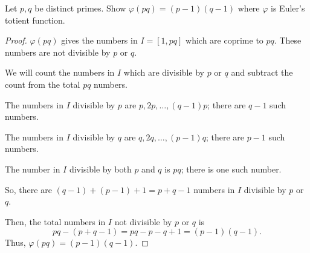 \documentclass[../hw2]{subfiles}
\begin{document}
\begin{problem}[7]
Let $p,q$ be distinct primes.
Show  $\varphi(pq)=(p-1)(q-1)$ where  $\varphi$ is Euler's totient function.
\end{problem}
\begin{proof}
	$\varphi(pq)$ gives the numbers in  $I=[1,pq]$ which are coprime to $pq$.
	These numbers are not divisible by  $p$ or  $q$.

	We will count the numbers in  $I$ which are divisible by  $p$ or  $q$ and subtract the count from the total  $pq$ numbers.

	The numbers in $I$ divisible by $p$ are  $p,2p,\ldots,(q-1)p$; there are $q-1$ such numbers.

	The numbers in $I$ divisible by  $q$ are  $q,2q,\ldots,(p-1)q$; there are $p-1$ such numbers.

	The number in  $I$ divisible by both  $p$ and  $q$  is $pq$; there is one such number.

	So, there are  $(q-1)+(p-1)+1=p+q-1$ numbers in  $I$ divisible by  $p$ or  $q$.

	Then, the total numbers in  $I$ not divisible by  $p$ or  $q$ is  \[
		pq-(p+q-1)=pq-p-q+1=(p-1)(q-1)
		.\]
	Thus, $\varphi(pq) = (p-1)(q-1)$.
\end{proof}
\end{document}
